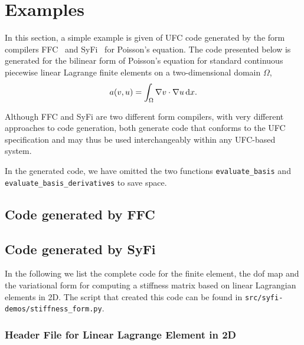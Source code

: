 \chapter{Examples}

In this section, a simple example is given of UFC code generated by
the form compilers
FFC~\cite{www:ffc,logg:article:07,logg:article:09,logg:article:10,logg:article:11}
and SyFi~\cite{www:syfi} for Poisson's equation. The code presented
below is generated for the bilinear form of Poisson's equation for
standard continuous piecewise linear Lagrange finite elements on a
two-dimensional domain $\Omega$,
\begin{equation}
  a(v, u) = \int_{\Omega} \nabla v \cdot \nabla u \, \mathrm{d}x.
\end{equation}

Although FFC and SyFi are two different form compilers, with very
different approaches to code generation, both generate code that
conforms to the UFC specification and may thus be used interchangeably
within any UFC-based system.

In the generated code, we have omitted the two functions
\texttt{evaluate\_basis} and
\texttt{evaluate\_basis\_derivatives}\footnotemark{} to save space.


\section{Code generated by FFC}

\scriptsize
{}
\normalsize

\section{Code generated by SyFi}

In the following we list the complete code for the finite element, 
the dof map and the variational form for computing a stiffness matrix
based on linear Lagrangian elements in 2D. 
The script that created this code can be found in \texttt{src/syfi-demos/stiffness\_form.py}. 


\subsection{Header File for Linear Lagrange Element in 2D}

